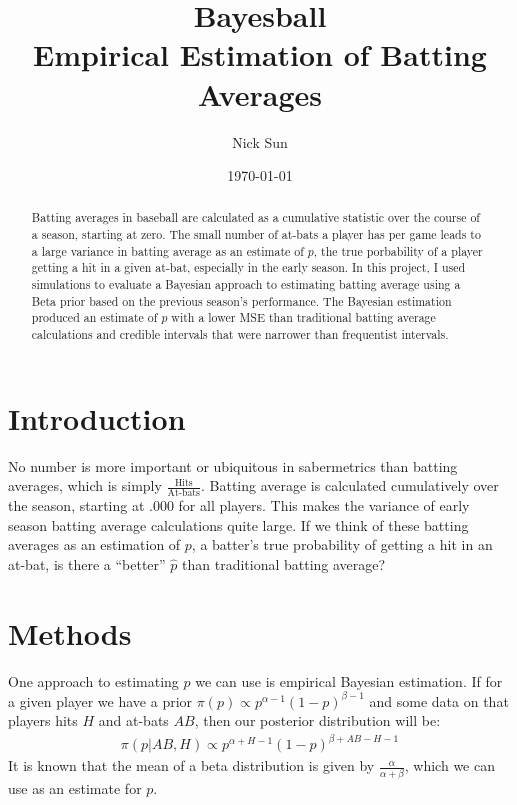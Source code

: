 \documentclass[10pt,a4paper]{article}
\title{\vspace{-2.0cm} Bayesball \\
\large Empirical Estimation of Batting Averages
}
\date{\today}
\author{Nick Sun}
\begin{document}
\maketitle

\begin{abstract}
	Batting averages in baseball are calculated as a cumulative statistic over the course of a season, starting at zero.
	The small number of at-bats a player has per game leads to a large variance in batting average as an estimate of $p$, the true porbability of a player getting a hit in a given at-bat, especially in the early season.
	In this project, I used simulations to evaluate a Bayesian approach to estimating batting average using a Beta prior based on the previous season's performance.
	The Bayesian estimation produced an estimate of $p$ with a lower MSE than traditional batting average calculations and credible intervals that were narrower than frequentist intervals.
\end{abstract}

\section{Introduction}
No number is more important or ubiquitous in sabermetrics than batting averages, which is simply $\frac{\text{Hits}}{\text{At-bats}}$.
Batting average is calculated cumulatively over the season, starting at .000 for all players.
This makes the variance of early season batting average calculations quite large.
If we think of these batting averages as an estimation of $p$, a batter's true probability of getting a hit in an at-bat, is there a ``better'' $\hat{p}$ than traditional batting average?

\section{Methods}
One approach to estimating $p$ we can use is empirical Bayesian estimation.
If for a given player we have a prior $\pi(p) \propto p^{\alpha-1} (1 -p)^{\beta-1}$ and some data on that players hits $H$ and at-bats $AB$, then our posterior distribution will be:
\begin{align*}
\pi(p | AB, H) \propto p^{\alpha + H - 1} (1 - p)^{\beta + AB - H - 1}
\end{align*}
It is known that the mean of a beta distribution is given by $\frac{\alpha}{\alpha+\beta}$, which we can use as an estimate for $p$.
\end{document}
